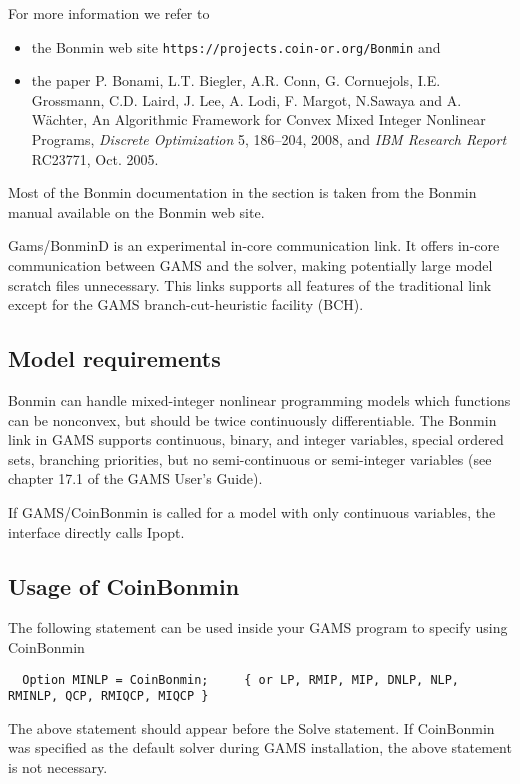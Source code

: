 For more information we refer to
\begin{itemize}
\item the Bonmin web site \texttt{https://projects.coin-or.org/Bonmin} and
\item the paper P. Bonami, L.T. Biegler, A.R. Conn, G. Cornuejols, I.E. Grossmann, C.D. Laird, J. Lee, A. Lodi, F. Margot, N.Sawaya and A. W\"achter, An Algorithmic Framework for Convex Mixed Integer Nonlinear Programs, \emph{Discrete Optimization} 5, 186--204, 2008, and \emph{IBM Research Report} RC23771, Oct. 2005.
\end{itemize}
Most of the Bonmin documentation in the section is taken from the Bonmin manual available on the Bonmin web site.

Gams/BonminD is an experimental in-core communication link.
It offers in-core communication between GAMS and the solver, making potentially large model scratch files unnecessary.
This links supports all features of the traditional link except for the GAMS branch-cut-heuristic facility (BCH).

\subsection{Model requirements}

Bonmin can handle mixed-integer nonlinear programming models which functions can be nonconvex, but should be twice continuously differentiable.
The Bonmin link in GAMS supports continuous, binary, and integer variables, special ordered sets, branching priorities, but no semi-continuous or semi-integer variables (see chapter 17.1 of the GAMS User's Guide).

If GAMS/CoinBonmin is called for a model with only continuous variables, the interface directly calls Ipopt.

\subsection{Usage of CoinBonmin}

The following statement can be used inside your GAMS program to specify using CoinBonmin
\begin{verbatim}
  Option MINLP = CoinBonmin;     { or LP, RMIP, MIP, DNLP, NLP, RMINLP, QCP, RMIQCP, MIQCP }
\end{verbatim}

The above statement should appear before the Solve statement.
If CoinBonmin was specified as the default solver during GAMS installation, the above statement is not necessary.

